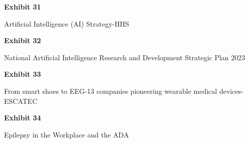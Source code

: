 \documentclass{article}
\begin{document}
 

\vspace*{\fill}
\begin{center}

{\LARGE \bf
Exhibit 31
}

\vspace{10\baselineskip}

{\large Artificial Intelligence (AI) Strategy-HHS}

\end{center}
\vspace*{\fill}

 

\vspace*{\fill}
\begin{center}

{\LARGE \bf
Exhibit 32
}

\vspace{10\baselineskip}

{\large National Artificial Intelligence Research and Development Strategic Plan 2023}

\end{center}
\vspace*{\fill}

%

\vspace*{\fill}
\begin{center}

{\LARGE \bf
Exhibit 33
}

\vspace{10\baselineskip}

{\large From smart shoes to EEG-13 companies pioneering wearable medical devices-ESCATEC}

\end{center}
\vspace*{\fill}

 


\vspace*{\fill}
\begin{center}

{\LARGE \bf
Exhibit 34
}

\vspace{10\baselineskip}

{\large Epilepsy in the Workplace and the ADA}

\end{center}
\vspace*{\fill}
\end{document}
